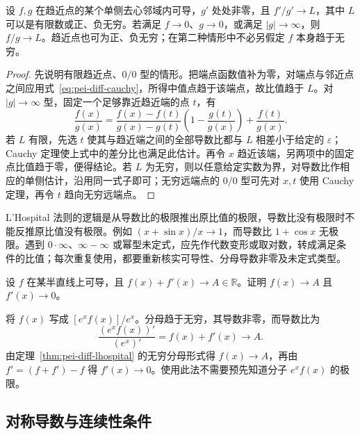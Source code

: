 \begin{theorem}
\label{thm:pei-diff-lhospital}
设 $f,g$ 在趋近点的某个单侧去心邻域内可导，$g'$ 处处非零，且 $f'/g'\to L$，其中 $L$ 可以是有限数或正、负无穷。若满足 $f\to0$、$g\to0$，或满足 $|g|\to\infty$，则 $f/g\to L$。趋近点也可为正、负无穷；在第二种情形中不必另假定 $f$ 本身趋于无穷。
\end{theorem}
\begin{proof}
先说明有限趋近点、$0/0$ 型的情形。把端点函数值补为零，对端点与邻近点之间应用式~\eqref{eq:pei-diff-cauchy}，所得中值点趋于该端点，故比值趋于 $L$。对 $|g|\to\infty$ 型，固定一个足够靠近趋近端的点 $t$，有
\[
 \frac{f(x)}{g(x)}
 =\frac{f(x)-f(t)}{g(x)-g(t)}
   \left(1-\frac{g(t)}{g(x)}\right)+\frac{f(t)}{g(x)}.
\]
若 $L$ 有限，先选 $t$ 使其与趋近端之间的全部导数比都与 $L$ 相差小于给定的 $\varepsilon$；Cauchy 定理使上式中的差分比也满足此估计。再令 $x$ 趋近该端，另两项中的固定点比值趋于零，便得结论。若 $L$ 为无穷，则以任意给定实数为界，对导数比作相应的单侧估计，沿用同一式子即可；无穷远端点的 $0/0$ 型可先对 $x,t$ 使用 Cauchy 定理，再令 $t$ 趋向无穷远端点。
\end{proof}

\begin{notealert}[type=caution,title={使用法则前先辨认条件}]
L'Hospital 法则的逻辑是从导数比的极限推出原比值的极限，导数比没有极限时不能反推原比值没有极限。例如 $(x+\sin x)/x\to1$，而导数比 $1+\cos x$ 无极限。遇到 $0\cdot\infty$、$\infty-\infty$ 或幂型未定式，应先作代数变形或取对数，转成满足条件的比值；每次重复使用，都要重新核实可导性、分母导数非零及未定式类型。
\end{notealert}

\begin{example}
\label{ex:pei-diff-f-plus-derivative}
设 $f$ 在某半直线上可导，且 $f(x)+f'(x)\to A\in\mathbb R$。证明 $f(x)\to A$ 且 $f'(x)\to0$。
\end{example}
\begin{solve}
将 $f(x)$ 写成 $[e^x f(x)]/e^x$。分母趋于无穷，其导数非零，而导数比为
\[
 \frac{(e^xf(x))'}{(e^x)'}=f(x)+f'(x)\longrightarrow A.
\]
由定理~\ref{thm:pei-diff-lhospital} 的无穷分母形式得 $f(x)\to A$，再由 $f'=(f+f')-f$ 得 $f'(x)\to0$。使用此法不需要预先知道分子 $e^xf(x)$ 的极限。
\end{solve}

\subsection{对称导数与连续性条件}


